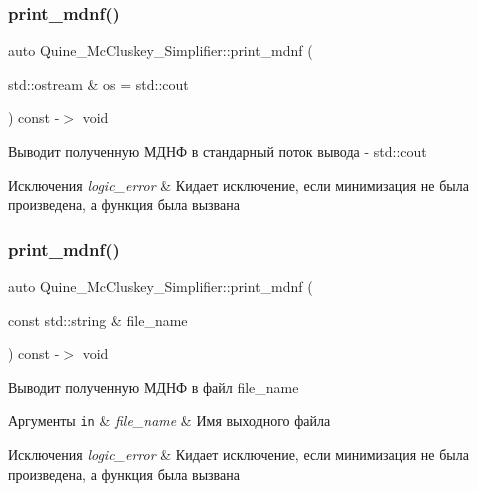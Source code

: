 \subsubsection{\texorpdfstring{print\+\_\+mdnf()}{print\_mdnf()}\hspace{0.1cm}{\footnotesize\ttfamily [1/2]}}
{\footnotesize\ttfamily auto Quine\+\_\+\+Mc\+Cluskey\+\_\+\+Simplifier\+::print\+\_\+mdnf (\begin{DoxyParamCaption}\item[{std\+::ostream \&}]{os = {\ttfamily std\+:\+:cout} }\end{DoxyParamCaption}) const -\/$>$ void}

Выводит полученную МДНФ в стандарный поток вывода -\/ std\+::cout 
\begin{DoxyExceptions}{Исключения}
{\em logic\+\_\+error} & Кидает исключение, если минимизация не была произведена, а функция была вызвана \\
\hline
\end{DoxyExceptions}
\mbox{\label{class_quine___mc_cluskey___simplifier_abf18d439c61c677f833a297caf64b6db}} 
\subsubsection{\texorpdfstring{print\+\_\+mdnf()}{print\_mdnf()}\hspace{0.1cm}{\footnotesize\ttfamily [2/2]}}
{\footnotesize\ttfamily auto Quine\+\_\+\+Mc\+Cluskey\+\_\+\+Simplifier\+::print\+\_\+mdnf (\begin{DoxyParamCaption}\item[{const std\+::string \&}]{file\+\_\+name }\end{DoxyParamCaption}) const -\/$>$ void}

Выводит полученную МДНФ в файл file\+\_\+name 
\begin{DoxyParams}[1]{Аргументы}
\mbox{\tt in}  & {\em file\+\_\+name} & Имя выходного файла \\
\hline
\end{DoxyParams}

\begin{DoxyExceptions}{Исключения}
{\em logic\+\_\+error} & Кидает исключение, если минимизация не была произведена, а функция была вызвана \\
\hline
\end{DoxyExceptions}
\mbox{\label{class_quine___mc_cluskey___simplifier_a0e238671acf06cbf2078c6ebc6ef1276}} 
